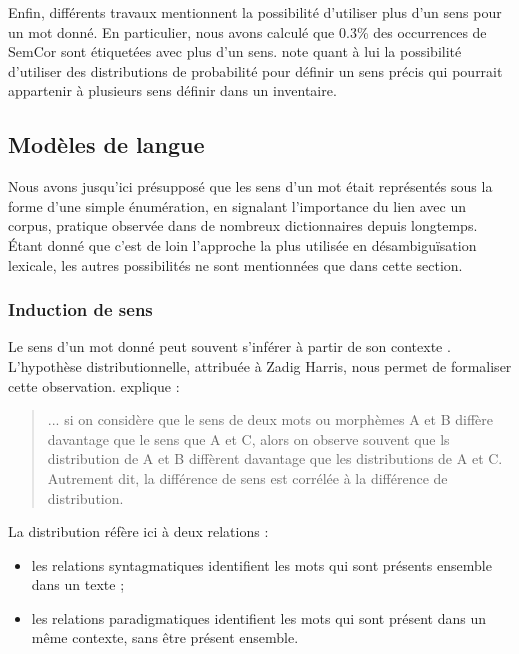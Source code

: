 Enfin, différents travaux mentionnent la possibilité d'utiliser plus d'un sens
pour un mot donné.
En particulier, nous avons calculé que 0.3\% des occurrences de SemCor sont
étiquetées avec plus d'un sens. \cite{smith2011rumble} note quant à lui la
possibilité d'utiliser des distributions de probabilité pour définir un sens
précis qui pourrait appartenir à plusieurs sens définir dans un inventaire.


\subsection{Modèles de langue}

Nous avons jusqu'ici présupposé que les sens d'un mot était représentés sous la
forme d'une simple énumération, en signalant l'importance du lien avec un
corpus, pratique observée dans de nombreux dictionnaires depuis longtemps.
Étant donné que c'est de loin l'approche la plus utilisée en désambiguïsation
lexicale, les autres possibilités ne sont mentionnées que dans cette section.

\subsubsection{Induction de sens}
\label{distrib}

Le sens d'un mot donné peut souvent s'inférer à partir de son contexte
\citep{pantel2002discovering}. L'hypothèse distributionnelle, attribuée à Zadig
Harris, nous permet de formaliser cette observation.
\cite[p.~786]{harris1954distributional} explique :

\begin{quote} ... si on considère que le sens de deux mots ou morphèmes A et B
    diffère davantage que le sens que A et C, alors on observe souvent que ls
    distribution de A et B diffèrent davantage que les distributions de A et C.
    Autrement dit, la différence de sens est corrélée à la différence de
    distribution.  \end{quote}

La distribution réfère ici à deux relations \citep{sahlgren2008distributional}
:

\begin{itemize}

    \item les relations syntagmatiques identifient les mots qui sont présents
        ensemble dans un texte ;

    \item les relations paradigmatiques identifient les mots qui sont présent
        dans un même contexte, sans être présent ensemble.

\end{itemize}

